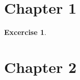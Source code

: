 \documentclass{article}
\newtheorem{example}{Excercise}[section]
\begin{document}
\section{Chapter 1}

\begin{example}

\end{example}

\section{Chapter 2}
\end{document}
